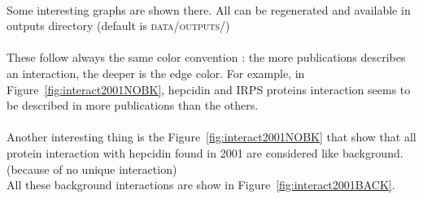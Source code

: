 \documentclass{report} %
\begin{document}
        \paragraph*{}
        Some interesting graphs are shown there. All can be regenerated and available in outputs directory (default is \textsc{data/outputs/})
        \paragraph*{}
        These follow always the same color convention : the more publications describes an interaction, the deeper is the edge color.
        For example, in Figure~\ref{fig:interact2001NOBK}, hepcidin and IRPS proteins interaction seems to be described in more publications than the others.
        \paragraph*{}
        Another interesting thing is the Figure~\ref{fig:interact2001NOBK} that show that all protein interaction with hepcidin found in 2001 
        are considered like background. (because of no unique interaction)\\
        All these background interactions are show in Figure~\ref{fig:interact2001BACK}.
\end{document}
